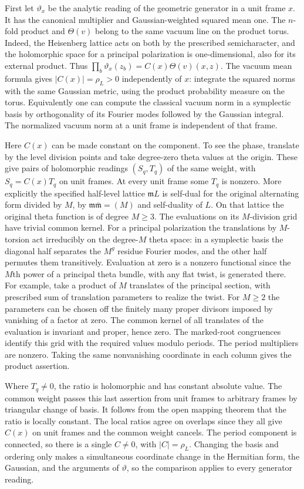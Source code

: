 First let $\vartheta_x$ be the analytic reading of the geometric
generator in a unit frame $x$. It has the canonical multiplier and
Gaussian-weighted squared mean one. The $n$-fold product and
$\Theta(v)$ belong to the same vacuum line on the product torus.
Indeed, the Heisenberg lattice acts on both by the prescribed
semicharacter, and the holomorphic space for a principal polarization
is one-dimensional, also for its external product. Thus
$\prod_b\vartheta_x(z_b)=C(x)\Theta(v)(x,z)$. The vacuum mean
formula gives $|C(x)|=\rho_L>0$ independently of $x$: integrate
the squared norms with the same Gaussian metric, using the product
probability measure on the torus. Equivalently one can compute the
classical vacuum norm in a symplectic basis by orthogonality of its
Fourier modes followed by the Gaussian integral. The normalized
vacuum norm at a unit frame is independent of that frame.

Here $C(x)$ can be made constant on the component. To see the phase,
translate by the level division points and take degree-zero theta
values at the origin. These give pairs of holomorphic readings
$(S_q,T_q)$ of the same weight, with $S_q=C(x)T_q$ on unit frames.
At every unit frame some $T_q$ is nonzero. More explicitly the
specified half-level lattice $\mathfrak m L$ is self-dual for
the original alternating form divided by $M$, by
$\mathfrak m\overline{\mathfrak m}=(M)$ and self-duality of $L$.
On that lattice the original theta function is of degree $M\ge3$.
The evaluations on its $M$-division grid have trivial common
kernel. For a principal polarization the translations by
$M$-torsion act irreducibly on the degree-$M$ theta space:
in a symplectic basis the diagonal half separates the
$M^g$ residue Fourier modes, and the other half permutes them
transitively. Evaluation at zero is a nonzero functional since the
$M$th power of a principal theta bundle, with any flat twist, is
generated there. For example, take a product of $M$ translates of
the principal section, with prescribed sum of translation parameters
to realize the twist. For $M\ge2$ the parameters can be chosen
off the finitely many proper divisors imposed by vanishing of a
factor at zero. The common kernel of all translates of the evaluation
is invariant and proper, hence zero. The marked-root congruences
identify this grid with the required values modulo periods. The period multipliers are nonzero. Taking the same nonvanishing
coordinate in each column gives the product assertion.

Where $T_q\ne0$, the ratio is holomorphic and has constant absolute
value. The common weight passes this last assertion from unit frames
to arbitrary frames by triangular change of basis. It follows from
the open mapping theorem that the ratio is locally constant.
The local ratios agree on overlaps since they all give $C(x)$ on
unit frames and the common weight cancels. The period component is
connected, so there is a single $C\ne0$, with $|C|=\rho_L$.
Changing the basis and ordering only makes a simultaneous coordinate
change in the Hermitian form, the Gaussian, and the arguments of
$\vartheta$, so the comparison applies to every generator reading.

